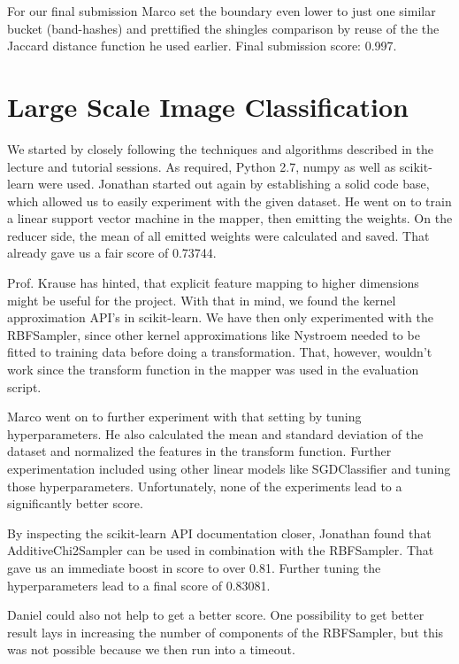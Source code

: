 \documentclass[a4paper, 11pt]{article}
\begin{document}
For our final submission Marco set the boundary even lower to just one similar bucket (band-hashes) and prettified the shingles comparison by reuse of the the Jaccard distance function he used earlier. Final submission score: 0.997.

\maketitle

\section*{Large Scale Image Classification}
We started by closely following the techniques and algorithms described in the lecture and tutorial sessions. As required, Python 2.7, numpy as well as scikit-learn were used.
Jonathan started out again by establishing a solid code base, which allowed us to easily experiment with the given dataset. He went on to train a linear support vector machine in the mapper, then emitting the weights. On the reducer side, the mean of all emitted weights were calculated and saved. That already gave us a fair score of 0.73744.

Prof. Krause has hinted, that explicit feature mapping to higher dimensions might be useful for the project. With that in mind, we found the kernel approximation API's in scikit-learn. We have then only experimented with the RBFSampler, since other kernel approximations like Nystroem needed to be fitted to training data before doing a transformation. That, however, wouldn't work since the transform function in the mapper was used in the evaluation script.

Marco went on to further experiment with that setting by tuning hyperparameters. He also calculated the mean and standard deviation of the dataset and normalized the features in the transform function. Further experimentation included using other linear models like SGDClassifier and tuning those hyperparameters. Unfortunately, none of the experiments lead to a significantly better score.

By inspecting the scikit-learn API documentation closer, Jonathan found that AdditiveChi2Sampler can be used in combination with the RBFSampler. That gave us an immediate boost in score to over 0.81. Further tuning the hyperparameters lead to a final score of 0.83081.

Daniel could also not help to get a better score. One possibility to get better result lays in increasing the number of components of the RBFSampler, but this was not possible because we then run into a timeout.
\end{document}
